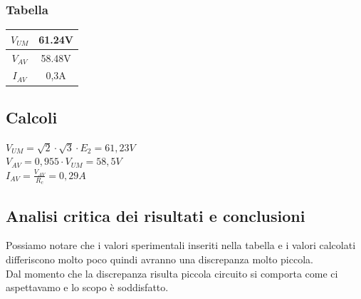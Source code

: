 \documentclass[12pt]{article}
\begin{document}
\subsubsection{Tabella}
\begin{table}[ht]
    \centering
    \begin{tabular}{|c|c|}
        \hline
        \rowcolor{RoyalBlue!80}     $V_{UM}$ & 61.24V\\\hline
        \rowcolor{ForestGreen!80}     $V_{AV}$ & 58.48V\\\hline
        \rowcolor{Goldenrod!80}     $I_{AV}$ & 0,3A\\\hline
    \end{tabular}
\end{table}
\subsection{Calcoli}
$V_{UM}=\sqrt{2}\cdot\sqrt{3}\cdot E_2=61,23V$\\
$V_{AV}=0,955\cdot V_{UM}=58,5V$\\
$I_{AV}=\frac{V_{AV}}{R_c}=0,29A$\\
\subsection{Analisi critica dei risultati e conclusioni}
Possiamo notare che i valori sperimentali inseriti nella tabella e i valori calcolati differiscono
molto poco quindi avranno una discrepanza molto piccola.\\
Dal momento che la discrepanza risulta piccola circuito si comporta come ci aspettavamo e lo scopo è soddisfatto.\\
\end{document}
